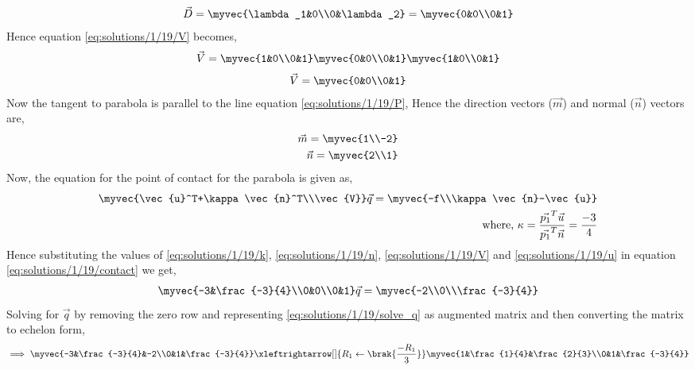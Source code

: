 \begin{align}
\vec{D} = \myvec{\lambda_1&0\\0&\lambda_2} = \myvec{0&0\\0&1}
\end{align}
Hence equation \eqref{eq:solutions/1/19/V} becomes,
\begin{align}
\vec{V} = \myvec{1&0\\0&1}\myvec{0&0\\0&1}\myvec{1&0\\0&1}
\end{align}
\begin{align}
\vec{V} = \myvec{0&0\\0&1}
\end{align}
Now the tangent to parabola is parallel to the line equation \eqref{eq:solutions/1/19/P}, Hence the direction vectors ($\vec{m}$) and normal ($\vec{n}$)  vectors are,
\begin{align}
\vec{m} = \myvec{1\\-2}\\
\vec{n} = \myvec{2\\1}\label{eq:solutions/1/19/n}
\end{align} 
Now, the equation for the point of contact for the parabola is given as,
\begin{align}
\myvec{\vec{u}^T+\kappa\vec{n}^T\\\vec{V}}\vec{q} = \myvec{-f\\\kappa\vec{n}-\vec{u}}\label{eq:solutions/1/19/contact}\\
\mbox{where, } \kappa = \frac{\vec{p_1}^T\vec{u}}{\vec{p_1}^T\vec{n}} = \frac{-3}{4} \label{eq:solutions/1/19/k}
\end{align}
Hence substituting the values of \eqref{eq:solutions/1/19/k}, \eqref{eq:solutions/1/19/n}, \eqref{eq:solutions/1/19/V} and \eqref{eq:solutions/1/19/u} in equation \eqref{eq:solutions/1/19/contact} we get,
\begin{align}
\myvec{-3&\frac{-3}{4}\\0&0\\0&1}\vec{q} = \myvec{-2\\0\\\frac{-3}{4}}
\label{eq:solutions/1/19/solve_q}
\end{align}
Solving for $\vec{q}$ by removing the zero row and representing \eqref{eq:solutions/1/19/solve_q} as augmented matrix and then converting the matrix to echelon form,
\begin{align}
\implies \myvec{-3&\frac{-3}{4}&-2\\0&1&\frac{-3}{4}} \xleftrightarrow[]{R_1\leftarrow\brak{\frac{-R_1}{3}}} \myvec{1&\frac{1}{4}&\frac{2}{3}\\0&1&\frac{-3}{4}}
\end{align}
